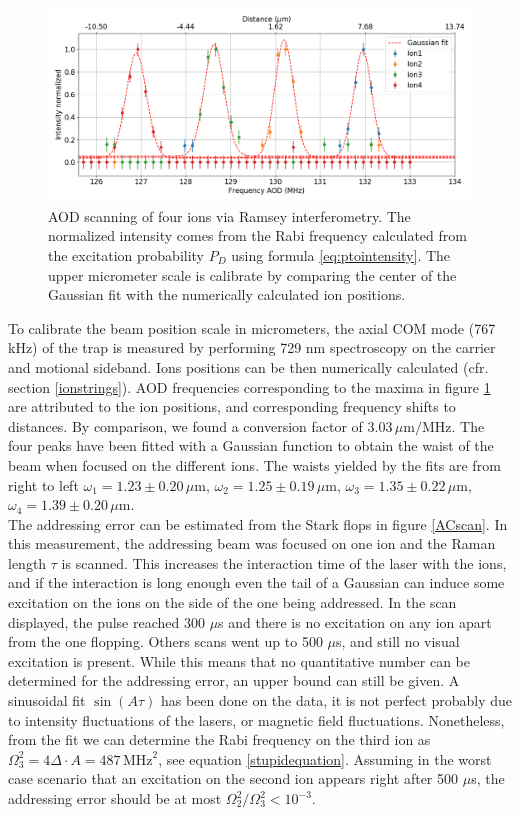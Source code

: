 \begin{figure}
\centering
\includegraphics[width=\textwidth]{img/AODScan}
\caption{AOD scanning of four ions via Ramsey interferometry. The normalized intensity comes from the Rabi frequency calculated from the excitation probability $P_D$ using formula \eqref{eq:ptointensity}. The upper micrometer scale is calibrate by comparing the center of the Gaussian fit with the numerically calculated ion positions.}
\label{AODscan}
\end{figure}
To calibrate the beam position scale in micrometers, the axial COM mode (767 kHz) of the trap is measured by performing 729 nm spectroscopy on the carrier and motional sideband. Ions positions can be then numerically calculated (cfr. section \ref{ionstrings}). AOD frequencies corresponding to the maxima in figure \ref{AODscan} are attributed to the ion positions, and corresponding frequency shifts to distances. By comparison, we found a conversion factor of $3.03\,\mu\text{m}/\text{MHz}$.
The four peaks have been fitted with a Gaussian function to obtain the waist of the beam when focused on the different ions. The waists yielded by the fits are from right to left $\omega_1 = 1.23\pm 0.20\,\mu$m, $\omega_2 = 1.25\pm 0.19\,\mu$m, $ \omega_3 = 1.35\pm 0.22\,\mu$m, $\omega_4 = 1.39\pm 0.20\,\mu$m.\\
The addressing error can be estimated from the Stark flops in figure \ref{ACscan}. In this measurement, the addressing beam was focused on one ion and the Raman length $\tau$ is scanned. This increases the interaction time of the laser with the ions, and if the interaction is long enough even the tail of a Gaussian can induce some excitation on the ions on the side of the one being addressed. In the scan displayed, the pulse reached 300 $\mu$s and there is no excitation on any ion apart from the one flopping. Others scans went up to 500 $\mu$s, and still no visual excitation is present. While this means that no quantitative number can be determined for the addressing error, an upper bound can still be given. A sinusoidal fit $\sin(A\tau)$ has been done on the data, it is not perfect probably due to intensity fluctuations of the lasers, or magnetic field fluctuations. Nonetheless, from the fit we can determine the Rabi frequency on the third ion as $\Omega_3^2 = 4\Delta \cdot A = 487\,\text{MHz}^2$, see equation \eqref{stupidequation}. Assuming in the worst case scenario that an excitation on the second ion appears right after 500 $\mu$s, the addressing error should be at most $\Omega_2^2/\Omega_3^2< 10^{-3}$.\\
